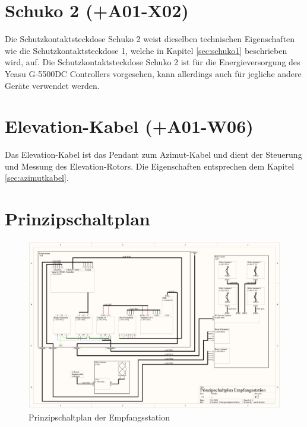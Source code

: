 \section{Schuko 2 (+A01-X02)}
Die Schutzkontaktsteckdose Schuko 2 weist dieselben technischen Eigenschaften wie die Schutzkontaktsteckdose 1, welche in Kapitel \ref{sec:schuko1} beschrieben wird, auf. Die Schutzkontaktsteckdose Schuko 2 ist für die Energieversorgung des Yeasu G-5500DC Controllers vorgesehen, kann allerdings auch für jegliche andere Geräte verwendet werden.

\section{Elevation-Kabel (+A01-W06)}
Das Elevation-Kabel ist das Pendant zum Azimut-Kabel und dient der Steuerung und Messung des Elevation-Rotors. Die Eigenschaften entsprechen dem Kapitel \ref{sec:azimutkabel}.

\section{Prinzipschaltplan}
\begin{landscape}
	\begin{figure}
		\centering
		\includegraphics[width=\linewidth]{../ref/Prinzipschaltplan.jpg}
		\caption{Prinzipschaltplan der Empfangsstation}
		\label{fig:prinzipschaltplan}
	\end{figure}
\end{landscape}
	




